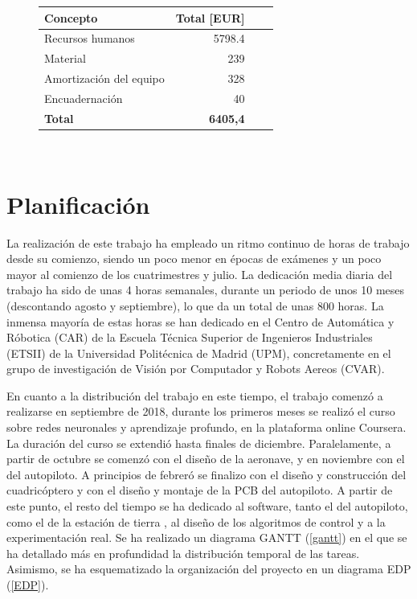 \begin{figure}[htb!]
	\centering
	\begin{tabular}{|l|r|r|r|}
		\hline
		\textbf{Concepto} &Total [EUR]\\
		\hline
		Recursos humanos & 5798.4\\
		Material &239\\
		Amortización del equipo & 328\\
		Encuadernación&40\\
		
		\hline
		\textbf{Total}   & \textbf{6405,4}\\
		\hline
	\end{tabular}\\
\end{figure}





\section{Planificación}
La realización de este trabajo ha empleado un ritmo continuo de horas de trabajo desde su comienzo, siendo un poco menor en épocas de exámenes y un poco mayor al comienzo de los cuatrimestres y julio. La dedicación media diaria del trabajo ha sido de unas 4 horas semanales, durante un periodo de unos 10 meses (descontando agosto y septiembre), lo que da un total de unas 800 horas. La inmensa mayoría de estas horas se han dedicado en el Centro de Automática y Róbotica (CAR) de la Escuela Técnica Superior de Ingenieros Industriales (ETSII) de la Universidad Politécnica de Madrid (UPM), concretamente en el grupo de investigación de Visión por Computador y Robots Aereos (CVAR).

En cuanto a la distribución del trabajo en este tiempo, el trabajo comenzó a realizarse en septiembre de 2018, durante los primeros meses se realizó el curso sobre redes neuronales y aprendizaje profundo, en la plataforma online Coursera. La duración del curso se extendió hasta finales de diciembre. Paralelamente, a partir de octubre se comenzó con el diseño de la aeronave, y en noviembre con el del autopiloto. A principios de febreró se finalizo con el diseño y construcción del cuadricóptero y con el diseño y montaje de la PCB del autopiloto. A partir de este punto, el resto del tiempo se ha dedicado al software, tanto el del autopiloto, como el de la estación de tierra , al diseño de los algoritmos de control y a la experimentación real. Se ha realizado un diagrama GANTT (\cref{gantt}) en el que se ha detallado más en profundidad la distribución temporal de las tareas. Asimismo, se ha esquematizado la organización del proyecto en un diagrama EDP (\cref{EDP}). 

